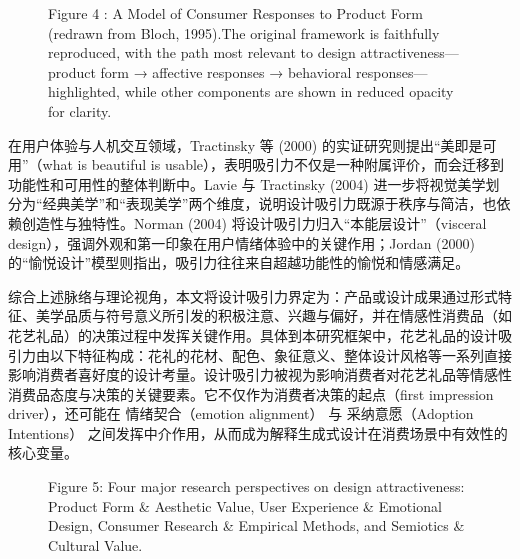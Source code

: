 \begin{figure}[htbp]

  \centering



  \caption{Figure 4 : A Model of Consumer Responses to Product Form (redrawn from Bloch, 1995).The original framework is faithfully reproduced, with the path most relevant to design attractiveness—product form → affective responses → behavioral responses—highlighted, while other components are shown in reduced opacity for clarity.}

  \label{fig:figure_4_a_model_of_consumer_responses_t}

\end{figure}

在用户体验与人机交互领域，Tractinsky 等 (2000) 的实证研究则提出“美即是可用”（what is beautiful is usable），表明吸引力不仅是一种附属评价，而会迁移到功能性和可用性的整体判断中。Lavie 与 Tractinsky (2004) 进一步将视觉美学划分为“经典美学”和“表现美学”两个维度，说明设计吸引力既源于秩序与简洁，也依赖创造性与独特性。Norman (2004) 将设计吸引力归入“本能层设计”（visceral design），强调外观和第一印象在用户情绪体验中的关键作用；Jordan (2000) 的“愉悦设计”模型则指出，吸引力往往来自超越功能性的愉悦和情感满足。

综合上述脉络与理论视角，本文将设计吸引力界定为：产品或设计成果通过形式特征、美学品质与符号意义所引发的积极注意、兴趣与偏好，并在情感性消费品（如花艺礼品）的决策过程中发挥关键作用。具体到本研究框架中，花艺礼品的设计吸引力由以下特征构成：花礼的花材、配色、象征意义、整体设计风格等一系列直接影响消费者喜好度的设计考量。设计吸引力被视为影响消费者对花艺礼品等情感性消费品态度与决策的关键要素。它不仅作为消费者决策的起点（first impression driver），还可能在 情绪契合（emotion alignment） 与 采纳意愿（Adoption Intentions） 之间发挥中介作用，从而成为解释生成式设计在消费场景中有效性的核心变量。

\begin{figure}[htbp]

  \centering



  \caption{Figure 5: Four major research perspectives on design attractiveness: Product Form \& Aesthetic Value, User Experience \& Emotional Design, Consumer Research \& Empirical Methods, and Semiotics \& Cultural Value.}

  \label{fig:figure_5_four_major_research_perspective}

\end{figure}

